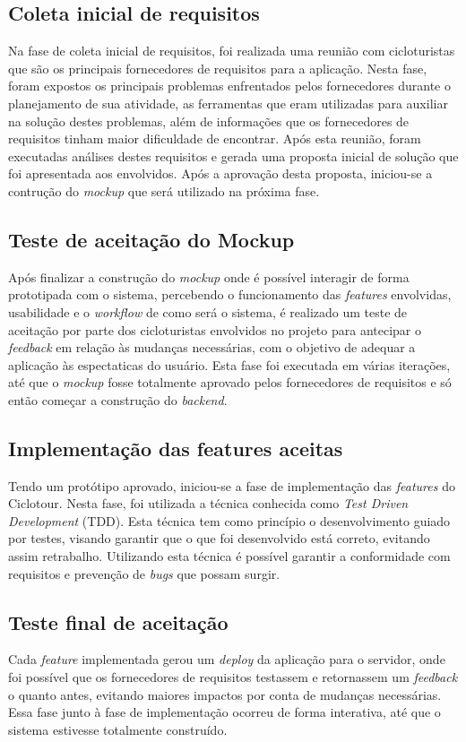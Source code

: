 \subsection{Coleta inicial de requisitos}
Na fase de coleta inicial de requisitos, foi realizada uma reunião com cicloturistas que são os principais fornecedores de requisitos para a 
aplicação. Nesta fase, foram expostos os principais problemas enfrentados pelos fornecedores durante o planejamento de sua atividade, as 
ferramentas que eram utilizadas para auxiliar na solução destes problemas, além de informações que os fornecedores de requisitos tinham maior
dificuldade de encontrar. Após esta reunião, foram executadas análises destes requisitos e gerada uma proposta inicial de solução que foi apresentada
aos envolvidos. Após a aprovação desta proposta, iniciou-se a contrução do \textit{mockup} que será utilizado na próxima fase.

\subsection{Teste de aceitação do Mockup}
Após finalizar a construção do \textit{mockup} onde é possível interagir de forma prototipada com o sistema, percebendo o funcionamento das 
\textit{features} envolvidas, usabilidade e o \textit{workflow} de como será o sistema, é realizado um teste de aceitação por parte dos 
cicloturistas envolvidos no projeto para antecipar o \textit{feedback} em relação às mudanças necessárias, com o objetivo de adequar a aplicação às 
espectaticas do usuário. Esta fase foi executada em várias iterações, até que o \textit{mockup} fosse totalmente aprovado pelos fornecedores de 
requisitos e só então começar a construção do \textit{backend}.

\subsection{Implementação das features aceitas}
Tendo um protótipo aprovado, iniciou-se a fase de implementação das \textit{features} do Ciclotour. Nesta fase, foi utilizada a técnica conhecida 
como \textit{Test Driven Development} (TDD). Esta técnica tem como princípio o desenvolvimento guiado por testes, visando garantir que o que foi 
desenvolvido está correto, evitando assim retrabalho. Utilizando esta técnica é possível garantir a conformidade com requisitos e prevenção de 
\textit{bugs} que possam surgir. 

\subsection{Teste final de aceitação}
Cada \textit{feature} implementada gerou um \textit{deploy} da aplicação para o servidor, onde foi possível que os fornecedores de requisitos testassem
e retornassem um \textit{feedback} o quanto antes, evitando maiores impactos por conta de mudanças necessárias. Essa fase junto à fase de 
implementação ocorreu de forma interativa, até que o sistema estivesse totalmente construído.

